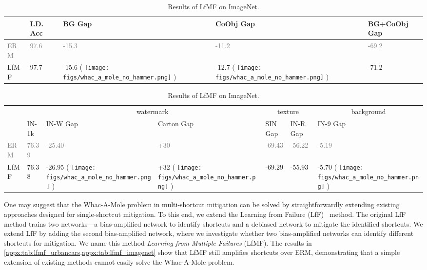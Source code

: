 \documentclass[10pt,twocolumn,letterpaper]{article}
\DeclareRobustCommand{\molenohammer}{\begingroup\normalfont
  \texttt{[image: figs/whac\_a\_mole\_no\_hammer.png]}\endgroup
}
\begin{document}
\begin{table}[t]
\parbox{.48\linewidth}{
\centering
\begin{adjustbox}{width=\linewidth}
\begin{tabular}{@{}lllll@{}}
\toprule
     & I.D. Acc & BG Gap         & CoObj Gap      & BG+CoObj Gap \\ \midrule
\textcolor{gray}{ERM}      & \textcolor{gray}{97.6}    & \textcolor{gray}{-15.3}         & \textcolor{gray}{-11.2}         & \textcolor{gray}{-69.2}         \\
LfMF & 97.7     & -15.6 (\textcolor{red}{} \molenohammer) & -12.7 (\textcolor{red}{} \molenohammer) & -71.2        \\ \bottomrule
\end{tabular}
\end{adjustbox}
\caption{Results of LfMF on UrbanCars dataset.}
\label{appx:tab:lfmf_urbancars}
}
\hfill
\parbox{.48\linewidth}{
\centering
\begin{adjustbox}{width=\linewidth}
\begin{tabular}{@{}lllllll@{}}
\toprule
\multicolumn{1}{c}{} & \multicolumn{1}{c|}{}      & \multicolumn{2}{c|}{watermark}                    & \multicolumn{2}{c|}{texture}            & \multicolumn{1}{c}{background} \\
                     & \multicolumn{1}{l|}{IN-1k} & IN-W Gap        & \multicolumn{1}{l|}{Carton Gap} & SIN Gap & \multicolumn{1}{l|}{IN-R Gap} & IN-9 Gap                       \\ \midrule
\textcolor{gray}{ERM}        & \textcolor{gray}{76.39}       & \textcolor{gray}{-25.40}     & \textcolor{gray}{+30}      & \textcolor{gray}{-69.43}         & \textcolor{gray}{-56.22}        & \textcolor{gray}{-5.19}                \\
LfMF                 & 76.38                      & -26.95 (\textcolor{red}{} \molenohammer) & +32 (\textcolor{red}{} \molenohammer)                     & -69.29  & -55.93                        & -5.70 (\textcolor{red}{} \molenohammer)                  \\ \bottomrule
\end{tabular}
\end{adjustbox}
\caption{Results of LfMF on ImageNet.}
\label{appx:tab:lfmf_imagenet}
}
\end{table}


One may suggest that the Whac-A-Mole problem in multi-shortcut mitigation can be solved by straightforwardly extending existing approaches designed for single-shortcut mitigation. To this end, we extend the Learning from Failure (LfF)~\cite{nam2020Adv.NeuralInf.Process.Syst.Learning} method. The original LfF method trains two networks---a bias-amplified network to identify shortcuts and a debiased network to mitigate the identified shortcuts. We extend LfF by adding the second bias-amplified network, where we investigate whether two bias-amplified networks can identify different shortcuts for mitigation. We name this method \textit{Learning from Multiple Failures} (LfMF). The results in \cref{appx:tab:lfmf_urbancars,appx:tab:lfmf_imagenet} show that LfMF still amplifies shortcuts over ERM, demonstrating that a simple extension of existing methods cannot easily solve the Whac-A-Mole problem.
\end{document}
